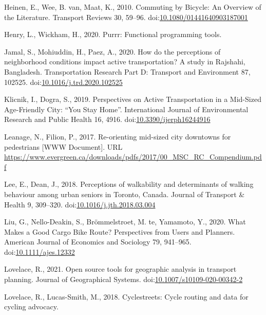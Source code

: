 \documentclass[]{elsarticle} %
\begin{document}
\leavevmode\hypertarget{ref-heinenCommutingBicycleOverview2010}{}%
Heinen, E., Wee, B. van, Maat, K., 2010. Commuting by Bicycle: An
Overview of the Literature. Transport Reviews 30, 59--96.
doi:\href{https://doi.org/10.1080/01441640903187001}{10.1080/01441640903187001}

\leavevmode\hypertarget{ref-R-purrr}{}%
Henry, L., Wickham, H., 2020. Purrr: Functional programming tools.

\leavevmode\hypertarget{ref-jamalHowPerceptionsNeighborhood2020}{}%
Jamal, S., Mohiuddin, H., Paez, A., 2020. How do the perceptions of
neighborhood conditions impact active transportation? A study in
Rajshahi, Bangladesh. Transportation Research Part D: Transport and
Environment 87, 102525.
doi:\href{https://doi.org/10.1016/j.trd.2020.102525}{10.1016/j.trd.2020.102525}

\leavevmode\hypertarget{ref-klicnikPerspectivesActiveTransportation2019}{}%
Klicnik, I., Dogra, S., 2019. Perspectives on Active Transportation in a
Mid-Sized Age-Friendly City: ``You Stay Home''. International Journal of
Environmental Research and Public Health 16, 4916.
doi:\href{https://doi.org/10.3390/ijerph16244916}{10.3390/ijerph16244916}

\leavevmode\hypertarget{ref-leanagereorientingmidsized2017}{}%
Leanage, N., Filion, P., 2017. Re-orienting mid-sized city downtowns for
pedestrians {[}WWW Document{]}. URL
\url{https://www.evergreen.ca/downloads/pdfs/2017/00_MSC_RC_Compendium.pdf}

\leavevmode\hypertarget{ref-leePerceptionsWalkabilityDeterminants2018}{}%
Lee, E., Dean, J., 2018. Perceptions of walkability and determinants of
walking behaviour among urban seniors in Toronto, Canada. Journal of
Transport \& Health 9, 309--320.
doi:\href{https://doi.org/10.1016/j.jth.2018.03.004}{10.1016/j.jth.2018.03.004}

\leavevmode\hypertarget{ref-liuWhatMakesGood2020}{}%
Liu, G., Nello-Deakin, S., Brömmelstroet, M. te, Yamamoto, Y., 2020.
What Makes a Good Cargo Bike Route? Perspectives from Users and
Planners. American Journal of Economics and Sociology 79, 941--965.
doi:\href{https://doi.org/10.1111/ajes.12332}{10.1111/ajes.12332}

\leavevmode\hypertarget{ref-lovelaceOpenSource2021}{}%
Lovelace, R., 2021. Open source tools for geographic analysis in
transport planning. Journal of Geographical Systems.
doi:\href{https://doi.org/10.1007/s10109-020-00342-2}{10.1007/s10109-020-00342-2}

\leavevmode\hypertarget{ref-Lovelace2018}{}%
Lovelace, R., Lucas-Smith, M., 2018. Cyclestreets: Cycle routing and
data for cycling advocacy.
\end{document}
